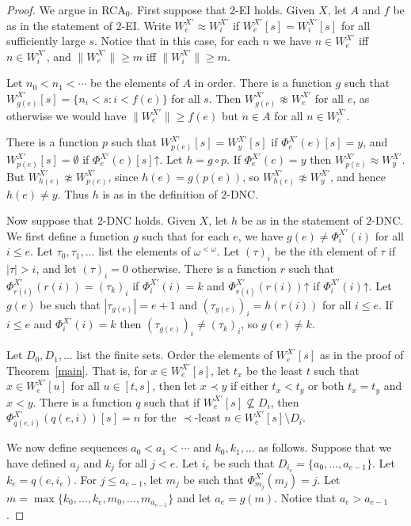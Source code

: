 \documentclass{amsart}
\theoremstyle{definition}
\renewcommand{\leq}{\leqslant}
\renewcommand{\geq}{\geqslant}
\newcommand{\diverges}{\mathord{\uparrow}}
\begin{document}
\begin{proof}
We argue in RCA$_0$. First suppose that $2$-EI holds. Given $X$, let
$A$ and $f$ be as in the statement of $2$-EI. Write $W_e^{X'} \approx
W_i^{X'}$ if $W_e^{X'}[s]=W_i^{X'}[s]$ for all sufficiently large
$s$. Notice that in this case, for each $n$ we have $n \in W_e^{X'}$
if{}f $n \in W_i^{X'}$, and $\|W_e^{X'}\| \geq m$ if{}f $\|W_i^{X'}\|
\geq m$.

Let $n_0<n_1<\cdots$ be the elements of $A$ in order. There is a
function $g$ such that $W_{g(e)}^{X'}[s]=\{n_i<s : i<f(e)\}$ for all
$s$. Then $W_{g(e)}^{X'} \not\approx W_e^{X'}$ for all $e$, as otherwise
we would have $\|W_e^{X'}\| \geq f(e)$ but $n \in A$ for all $n \in
W_e^{X'}$.

There is a function $p$ such that $W^{X'}_{p(e)}[s]=W^{X'}_{y}[s]$ if
$\Phi_e^{X'}(e)[s]=y$, and $W^{X'}_{p(e)}[s]=\emptyset$ if
$\Phi_e^{X'}(e)[s]\diverges$. Let $h = g \circ p$. If
$\Phi^{X'}_e(e)=y$ then $W^{X'}_{p(e)} \approx W^{X'}_y$. But
$W_{h(e)}^{X'} \not\approx W_{p(e)}^{X'}$, since $h(e)=g(p(e))$, so
$W^{X'}_{h(e)} \not\approx W^{X'}_y$, and hence $h(e) \neq y$. Thus
$h$ is as in the definition of $2$-DNC.

Now suppose that $2$-DNC holds. Given $X$, let $h$ be as in the
statement of $2$-DNC. We first define a function $g$ such that for
each $e$, we have $g(e) \neq \Phi_i^{X'}(i)$ for all $i \leq e$. Let
$\tau_0,\tau_1,\ldots$ list the elements of $\omega^{<\omega}$. Let
$(\tau)_i$ be the $i$th element of $\tau$ if $|\tau|>i$, and let
$(\tau)_i=0$ otherwise. There is a function $r$ such that
$\Phi^{X'}_{r(i)}(r(i))=(\tau_k)_i$ if $\Phi^{X'}_i(i)=k$ and
$\Phi^{X'}_{r(i)}(r(i))\diverges$ if $\Phi^{X'}_i(i)\diverges$. Let
$g(e)$ be such that $|\tau_{g(e)}|=e+1$ and
$(\tau_{g(e)})_i=h(r(i))$ for all $i \leq e$. If $i \leq e$ and
$\Phi_i^{X'}(i)=k$ then $(\tau_{g(e)})_i \neq (\tau_k)_i$, so $g(e)
\neq k$.

Let $D_0,D_1,\ldots$ list the finite sets. Order the elements of
$W^{X'}_e[s]$ as in the proof of Theorem~\ref{main}. That is, for $x
\in W^{X'}_e[s]$, let $t_x$ be the least $t$ such that $x \in
W^{X'}_e[u]$ for all $u \in [t,s]$, then let $x \prec y$ if either
$t_x<t_y$ or both $t_x=t_y$ and $x<y$. There is a function $q$ such
that if $W^{X'}_e[s] \nsubseteq D_i$, then
$\Phi^{X'}_{q(e,i)}(q(e,i))[s]=n$ for the $\prec$-least $n \in
W^{X'}_e[s] \setminus D_i$.

We now define sequences $a_0<a_1<\cdots$ and $k_0,k_1,\ldots$ as
follows. Suppose that we have defined $a_j$ and $k_j$ for all
$j<e$. Let $i_e$ be such that $D_{i_e}=\{a_0,\ldots,a_{e-1}\}$. Let
$k_e=q(e,i_e)$. For $j \leq a_{e-1}$, let $m_j$ be such that
$\Phi^{X'}_{m_j}(m_j)=j$. Let
$m=\max\{k_0,\ldots,k_e,m_0,\ldots,m_{a_{e-1}}\}$ and let
$a_e=g(m)$. Notice that $a_e>a_{e-1}$.


\end{proof}
\end{document}
